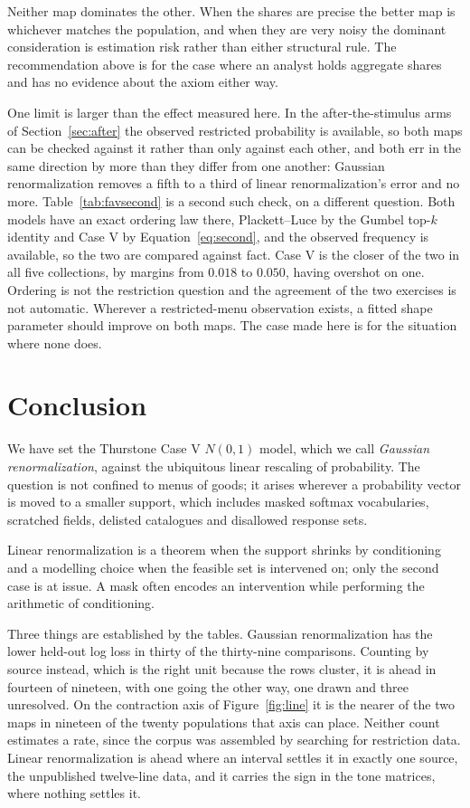 \documentclass[11pt]{article}
\theoremstyle{italichead}
\begin{document}
Neither map dominates the other. When the shares are precise the better map is whichever
matches the population, and when they are very noisy the dominant consideration is estimation
risk rather than either structural rule. The recommendation above is for the case where an
analyst holds aggregate shares and has no evidence about the axiom either way.

One limit is larger than the effect measured here. In the after-the-stimulus arms of
Section~\ref{sec:after} the observed restricted probability is available, so both maps can be
checked against it rather than only against each other, and both err in the same direction by
more than they differ from one another: Gaussian renormalization removes a fifth to a third of
linear renormalization's error and no more. Table~\ref{tab:favsecond} is a second such check, on
a different question. Both models have an exact ordering law there, Plackett--Luce by the Gumbel
top-$k$ identity and Case V by Equation~\eqref{eq:second}, and the observed frequency is
available, so the two are compared against fact. Case V is the closer of the two in all five
collections, by margins from $0.018$ to $0.050$, having overshot on one. Ordering is not the
restriction question and the agreement of the two exercises is not automatic. Wherever a
restricted-menu observation exists, a fitted shape parameter should improve on both maps. The
case made here is for the situation where none does.

\section{Conclusion}
\label{sec:conclusion}

We have set the Thurstone Case V $N(0,1)$ model, which we call \emph{Gaussian renormalization},
against the ubiquitous linear rescaling of probability. The question is not confined to menus of
goods; it arises wherever a probability vector is moved to a smaller support, which includes
masked softmax vocabularies, scratched fields, delisted catalogues and disallowed response sets.

Linear renormalization is a theorem when the support shrinks by conditioning and a modelling
choice when the feasible set is intervened on; only the second case is at issue. A mask often
encodes an intervention while performing the arithmetic of conditioning.

Three things are established by the tables. Gaussian renormalization has the lower held-out log
loss in thirty of the thirty-nine comparisons. Counting by source instead, which is the right
unit because the rows cluster, it is ahead in fourteen of nineteen, with one going the other way,
one drawn and three unresolved. On the contraction axis of Figure~\ref{fig:line} it is the
nearer of the two maps in nineteen of the twenty populations that axis can place. Neither count
estimates a rate, since the corpus was assembled by searching for restriction data. Linear
renormalization is ahead where an interval settles it in exactly one source, the unpublished
twelve-line data, and it carries the sign in the tone matrices, where nothing settles it.
\end{document}
